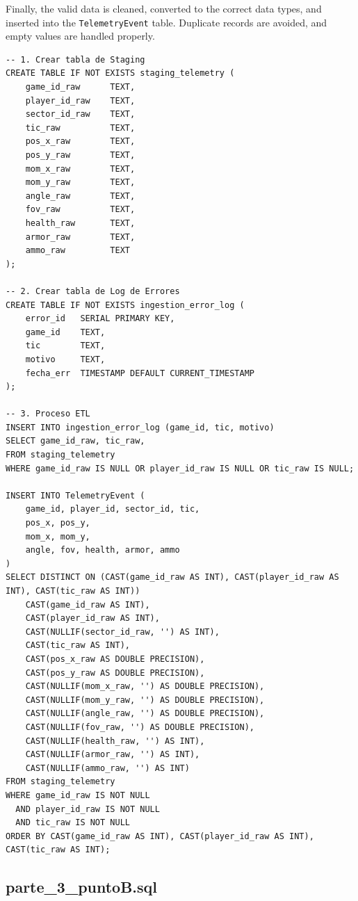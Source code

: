 \documentclass[11pt]{article}
\begin{document}
\smallskip

Finally, the valid data is cleaned, converted to the correct data types, and inserted into the \texttt{TelemetryEvent} table. Duplicate records are avoided, and empty values are handled properly.

\begin{lstlisting}[style=sqlstyle]
-- 1. Crear tabla de Staging
CREATE TABLE IF NOT EXISTS staging_telemetry (
    game_id_raw      TEXT,
    player_id_raw    TEXT,
    sector_id_raw    TEXT,
    tic_raw          TEXT,
    pos_x_raw        TEXT,
    pos_y_raw        TEXT,
    mom_x_raw        TEXT,
    mom_y_raw        TEXT,
    angle_raw        TEXT,
    fov_raw          TEXT,
    health_raw       TEXT,
    armor_raw        TEXT,
    ammo_raw         TEXT
);

-- 2. Crear tabla de Log de Errores 
CREATE TABLE IF NOT EXISTS ingestion_error_log (
    error_id   SERIAL PRIMARY KEY,
    game_id    TEXT,
    tic        TEXT,
    motivo     TEXT,
    fecha_err  TIMESTAMP DEFAULT CURRENT_TIMESTAMP
);

-- 3. Proceso ETL 
INSERT INTO ingestion_error_log (game_id, tic, motivo)
SELECT game_id_raw, tic_raw, 
FROM staging_telemetry
WHERE game_id_raw IS NULL OR player_id_raw IS NULL OR tic_raw IS NULL;

INSERT INTO TelemetryEvent (
    game_id, player_id, sector_id, tic, 
    pos_x, pos_y, 
    mom_x, mom_y, 
    angle, fov, health, armor, ammo
)
SELECT DISTINCT ON (CAST(game_id_raw AS INT), CAST(player_id_raw AS INT), CAST(tic_raw AS INT))
    CAST(game_id_raw AS INT),
    CAST(player_id_raw AS INT),
    CAST(NULLIF(sector_id_raw, '') AS INT),
    CAST(tic_raw AS INT),
    CAST(pos_x_raw AS DOUBLE PRECISION),
    CAST(pos_y_raw AS DOUBLE PRECISION),
    CAST(NULLIF(mom_x_raw, '') AS DOUBLE PRECISION),
    CAST(NULLIF(mom_y_raw, '') AS DOUBLE PRECISION),
    CAST(NULLIF(angle_raw, '') AS DOUBLE PRECISION),
    CAST(NULLIF(fov_raw, '') AS DOUBLE PRECISION),
    CAST(NULLIF(health_raw, '') AS INT),
    CAST(NULLIF(armor_raw, '') AS INT),
    CAST(NULLIF(ammo_raw, '') AS INT)
FROM staging_telemetry
WHERE game_id_raw IS NOT NULL 
  AND player_id_raw IS NOT NULL 
  AND tic_raw IS NOT NULL
ORDER BY CAST(game_id_raw AS INT), CAST(player_id_raw AS INT), CAST(tic_raw AS INT);
\end{lstlisting}

\clearpage
\subsection{parte\_3\_puntoB.sql}
\end{document}
